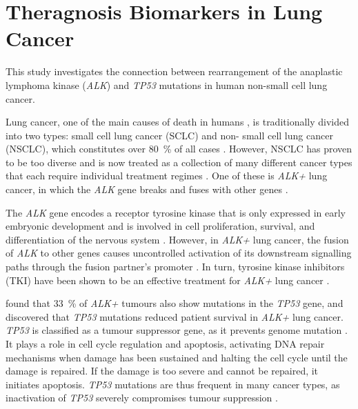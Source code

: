 
\chapter{Theragnosis Biomarkers in Lung Cancer}

This study investigates the connection between rearrangement of the anaplastic
lymphoma kinase (\textit{ALK}) and \textit{TP53} mutations in human non-small
cell lung cancer.

Lung cancer, one of the main causes of death in humans \citep{Siegel2018}, is
traditionally divided into two types: small cell lung cancer (SCLC) and non-%
small cell lung cancer (NSCLC), which constitutes over \SI{80}{\percent} of
all cases \citep{Reck2014}. However, NSCLC has proven to be too diverse and is
now treated as a collection of many different cancer types that each require
individual treatment regimes \citep{Boolell2015}. One of these is \textit{ALK+}
lung cancer, in which the \textit{ALK} gene breaks and fuses with other genes
\citep{Holla2017}.

The \textit{ALK} gene encodes a receptor tyrosine kinase that is only expressed
in early embryonic development and is involved in cell proliferation, survival,
and differentiation of the nervous system \citep{Iwahara1997}.
However, in \textit{ALK+} lung cancer, the fusion of \textit{ALK} to other genes
causes uncontrolled activation of its downstream signalling paths through the
fusion partner's promoter \citep{Holla2017}. In turn, tyrosine kinase inhibitors
(TKI) have been shown to be an effective treatment for \textit{ALK+} lung cancer
\citep{Kwak2010,Reck2014}.

\citet{Gainor2016} found that \SI{33}{\percent} of \textit{ALK+} tumours also
show mutations in the \textit{TP53} gene, and \citet{Aisner2018} discovered
that \textit{TP53} mutations reduced patient survival in \textit{ALK+} lung
cancer. \textit{TP53} is classified as a tumour suppressor gene, as it
prevents genome mutation \citep{Surget2013}. It plays a role in cell cycle
regulation and apoptosis, activating DNA repair mechanisms when damage has
been sustained and halting the cell cycle until the damage is repaired. If the
damage is too severe and cannot be repaired, it initiates apoptosis.
\textit{TP53} mutations are thus frequent in many cancer types, as 
inactivation of \textit{TP53} severely compromises tumour suppression \citep{%
Olivier2010}.

